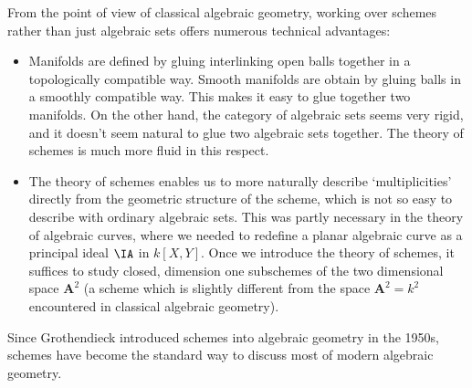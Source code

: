 From the point of view of classical algebraic geometry, working over schemes rather than just algebraic sets offers numerous technical advantages:
%
\begin{itemize}
    \item Manifolds are defined by gluing interlinking open balls together in a topologically compatible way. Smooth manifolds are obtain by gluing balls in a smoothly compatible way. This makes it easy to glue together two manifolds. On the other hand, the category of algebraic sets seems very rigid, and it doesn't seem natural to glue two algebraic sets together. The theory of schemes is much more fluid in this respect.

    \item The theory of schemes enables us to more naturally describe `multiplicities' directly from the geometric structure of the scheme, which is not so easy to describe with ordinary algebraic sets. This was partly necessary in the theory of algebraic curves, where we needed to redefine a planar algebraic curve as a principal ideal $\IA$ in $k[X,Y]$. Once we introduce the theory of schemes, it suffices to study closed, dimension one subschemes of the two dimensional space $\mathbf{A}^2$ (a scheme which is slightly different from the space $\mathbf{A}^2 = k^2$ encountered in classical algebraic geometry).
\end{itemize}
%
Since Grothendieck introduced schemes into algebraic geometry in the 1950s, schemes have become the standard way to discuss most of modern algebraic geometry.

%
%
%
%
%
%

